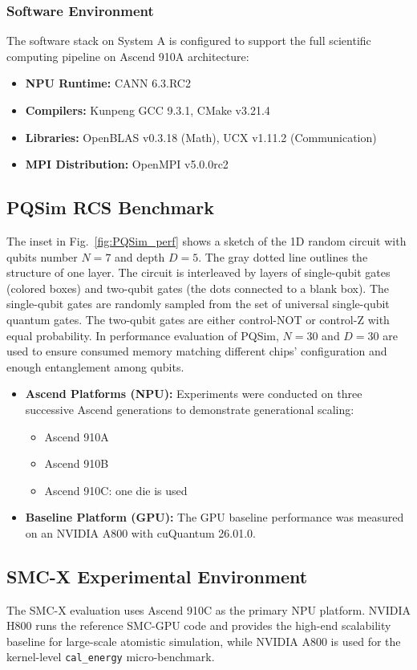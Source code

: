 \documentclass{article}
\begin{document}
\subsubsection{Software Environment}
The software stack on System A is configured to support the full scientific computing pipeline on Ascend 910A architecture:
\begin{itemize}
    \item \textbf{NPU Runtime:} CANN 6.3.RC2
    \item \textbf{Compilers:} Kunpeng GCC 9.3.1, CMake v3.21.4
    \item \textbf{Libraries:} OpenBLAS v0.3.18 (Math), UCX v1.11.2 (Communication)
    \item \textbf{MPI Distribution:} OpenMPI v5.0.0rc2
\end{itemize}

\subsection{PQSim RCS Benchmark}
The inset in Fig.~\ref{fig:PQSim_perf} shows a sketch of the 1D random circuit with qubits number $ N = 7$ and depth $ D = 5$. The gray dotted line outlines the structure of one layer. The circuit is interleaved by layers of single-qubit gates (colored boxes) and two-qubit gates (the dots connected to a blank box). The single-qubit gates are randomly sampled from the set of universal single-qubit quantum gates. The two-qubit gates are either control-NOT or control-Z with equal probability. In performance evaluation of PQSim, $ N = 30 $ and $ D = 30 $ are used to ensure consumed memory matching different chips' configuration and enough entanglement among qubits.

\begin{itemize}
    \item \textbf{Ascend Platforms (NPU):} Experiments were conducted on three successive Ascend generations to demonstrate generational scaling:
    \begin{itemize}
        \item Ascend 910A
        \item Ascend 910B
        \item Ascend 910C: one die is used  
    \end{itemize}
    \item \textbf{Baseline Platform (GPU):}
    The GPU baseline performance was measured on an NVIDIA A800 with cuQuantum 26.01.0.
\end{itemize}


\subsection{SMC-X Experimental Environment}
The SMC-X evaluation uses Ascend 910C as the primary NPU platform. NVIDIA H800 runs the reference SMC-GPU code and provides the high-end scalability baseline for large-scale atomistic simulation, while NVIDIA A800 is used for the kernel-level \texttt{cal\_energy} micro-benchmark.
\end{document}
